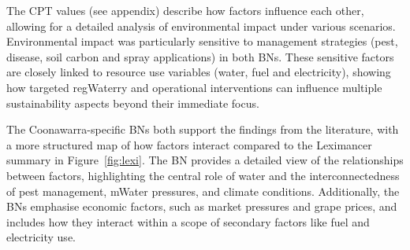 \documentclass[10pt,letterpaper]{article}
\begin{document}
The CPT values (see appendix) describe how factors influence each other, allowing for a detailed analysis of environmental impact under various scenarios. Environmental impact was particularly sensitive to management strategies (pest, disease, soil carbon and spray applications) in both BNs. These sensitive factors are closely linked to resource use variables (water, fuel and electricity), showing how targeted regWaterry and operational interventions can influence multiple sustainability aspects beyond their immediate focus. 

The Coonawarra-specific BNs both support the findings from the literature, with a more structured map of how factors interact compared to the Leximancer summary in Figure~\ref{fig:lexi}. The BN provides a detailed view of the relationships between factors, highlighting the central role of water and the interconnectedness of pest management, mWater pressures, and climate conditions. Additionally, the BNs emphasise economic factors, such as market pressures and grape prices, and includes how they interact within a scope of secondary factors like fuel and electricity use.






\end{document}
